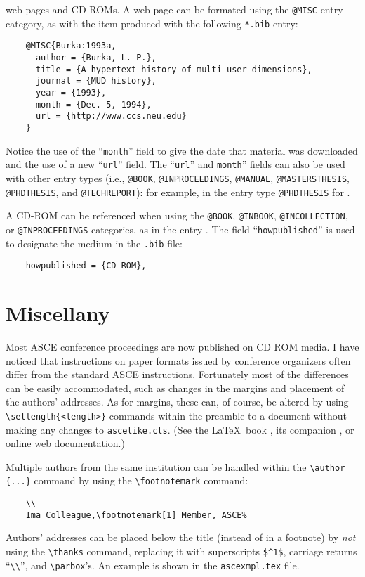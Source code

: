 \documentclass[Proceedings]{ascelike}
\begin{document}
web-pages and CD-ROMs.  A web-page can be formated using the
\texttt{@MISC} entry category, as with the item \cite{Burka:1993a} produced
with the following \texttt{*.bib} entry:
\begin{verbatim}
    @MISC{Burka:1993a,
      author = {Burka, L. P.},
      title = {A hypertext history of multi-user dimensions},
      journal = {MUD history},
      year = {1993},
      month = {Dec. 5, 1994},
      url = {http://www.ccs.neu.edu}
    }
\end{verbatim}
Notice the use of the ``\texttt{month}'' field to give the date that material
was downloaded and the use of a new ``\texttt{url}'' field.
The ``\texttt{url}'' and \texttt{month}'' 
fields can also be used with other entry types
(i.e., \texttt{@BOOK}, \texttt{@INPROCEEDINGS}, \texttt{@MANUAL},
\texttt{@MASTERSTHESIS}, \texttt{@PHDTHESIS}, and \texttt{@TECHREPORT}):
for example, in the entry type \texttt{@PHDTHESIS} for \cite{Wichtmann:2005a}.
%
\par
A CD-ROM can be referenced when using the \texttt{@BOOK}, \texttt{@INBOOK},
\texttt{@INCOLLECTION}, or \texttt{@INPROCEEDINGS} categories, 
as in the entry \cite{Liggett:1998a}.
The field ``\texttt{howpublished}'' is used to designate the medium
in the \texttt{.bib} file:
\begin{verbatim}
    howpublished = {CD-ROM},
\end{verbatim}
%
\section{Miscellany}
Most ASCE conference proceedings are now published on CD ROM media.
I have noticed that instructions on paper formats issued by
conference organizers often differ from the
standard ASCE instructions.  
Fortunately most of the differences can be easily accommodated, such as
changes in the margins and placement of the authors' addresses.
As for margins, these can, of course, be altered by using
\verb+\setlength{<length>}+ commands within the preamble to a document without
making any changes to \texttt{ascelike.cls}.  
(See the \LaTeX\ book
\cite{Lamport:1994a}, its companion \cite{Goossens:1994a}, or
online web documentation.)
%
\par
Multiple authors from the same institution can be handled within
the \verb|\author| \verb|{...}| command by using the \verb|\footnotemark| command:
\begin{verbatim}
    \\
    Ima Colleague,\footnotemark[1] Member, ASCE%
\end{verbatim}
%
\par\label{address.kluge}
Authors' addresses can be placed below the title (instead of
in a footnote) by \emph{not} using the \verb+\thanks+ command,
replacing it with superscripts \verb+$^1$+, carriage returns
``\verb+\\+'', and \verb+\parbox+'s.
An example is shown in the \texttt{ascexmpl.tex} file.
%
\end{document}
